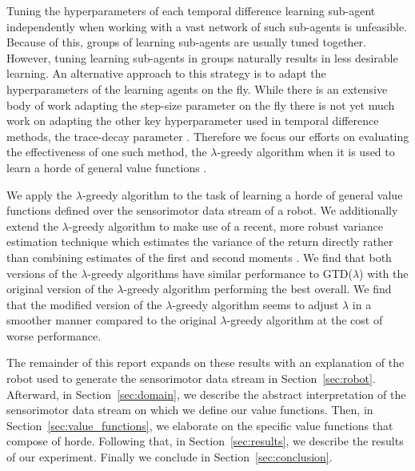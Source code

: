 \documentclass[../main.tex]{subfiles}
\begin{document}
Tuning the hyperparameters of each temporal difference learning sub-agent independently when working with a vast network of such sub-agents is unfeasible. Because of this, groups of learning sub-agents are usually tuned together. However, tuning learning sub-agents in groups naturally results in less desirable learning. An alternative approach to this strategy is to adapt the hyperparameters of the learning agents on the fly. While there is an extensive body of work adapting the step-size parameter on the fly \cite{zeiler2012adadelta, kearney2017adapting} there is not yet much work on adapting the other key hyperparameter used in temporal difference methods, the trace-decay parameter \cite{white2016greedy}. Therefore we focus our efforts on evaluating the effectiveness of one such method, the {$\lambda$}-greedy algorithm \cite{white2016greedy} when it is used to learn a horde of general value functions \cite{sutton2011horde}.

We apply the {$\lambda$}-greedy algorithm \cite{white2016greedy} to the task of learning a horde of general value functions \cite{sutton2011horde} defined over the sensorimotor data stream of a robot. We additionally extend the {$\lambda$}-greedy algorithm to make use of a recent, more robust variance estimation technique which estimates the variance of the return directly rather than combining estimates of the first and second moments \cite{sherstan2018directly}. We find that both versions of the {$\lambda$}-greedy algorithms have similar performance to GTD($\lambda$) \cite{sutton2009fast} with the original version of the {$\lambda$}-greedy algorithm performing the best overall. We find that the modified version of the {$\lambda$}-greedy algorithm seems to adjust $\lambda$ in a smoother manner compared to the original {$\lambda$}-greedy algorithm at the cost of worse performance.

The remainder of this report expands on these results with an explanation of the robot used to generate the sensorimotor data stream in Section~\ref{sec:robot}. Afterward, in Section~\ref{sec:domain}, we describe the abstract interpretation of the sensorimotor data stream on which we define our value functions. Then, in Section~\ref{sec:value_functions}, we elaborate on the specific value functions that compose of horde. Following that, in Section~\ref{sec:results}, we describe the results of our experiment. Finally we conclude in Section~\ref{sec:conclusion}.
\end{document}
